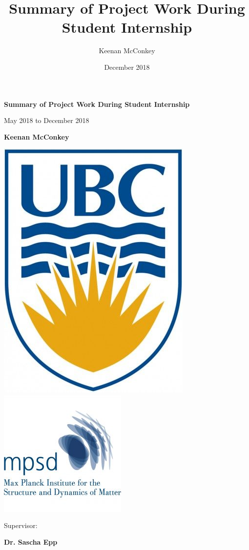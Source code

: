 \documentclass{article}
\title{Summary of Project Work During Student Internship}
\author{Keenan McConkey}
\date{December 2018}
\begin{document}
\begin{titlepage}
    \centering
    \Huge
    \textbf{Summary of Project Work During Student Internship}
    
    \vspace{1cm}
    \Large
    May 2018 to December 2018
    
    \vspace{2cm}

    \textbf{Keenan McConkey}
    
    \vfill
    \includegraphics[scale=0.25]{img/ubc_logo}  
    \hspace{1cm}
    \includegraphics[scale=0.5]{img/mpsd_logo}
    
    \vspace{3.5cm}
    Supervisor:
    
    \vspace{0.5cm}
    \textbf{Dr. Sascha Epp} 
\end{titlepage}
\end{document}
